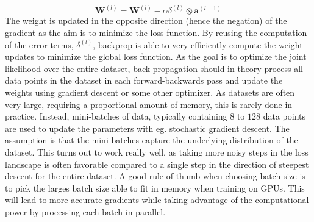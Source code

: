 \documentclass[a4paper,11pt]{article}
\begin{document}
\begin{equation} \label{eq:weight-update}
  \mathbf{W}^{(l)} = \mathbf{W}^{(l)} -\alpha \delta^{(l)} \otimes \mathbf{a}^{(l-1)}
\end{equation}
The weight is updated in the opposite direction (hence the negation) of the gradient as the aim is to minimize the loss function. By reusing the computation of the error terms, $\delta^{(l)}$, backprop is able to very efficiently compute the weight updates to minimize the global loss function. As the goal is to optimize the joint likelihood over the entire dataset, back-propagation should in theory process all data points in the dataset in each forward-backwards pass and update the weights using gradient descent or some other optimizer. As datasets are often very large, requiring a proportional amount of memory, this is rarely done in practice. Instead, mini-batches of data, typically containing $8$ to $128$ data points are used to update the parameters with eg. stochastic gradient descent. The assumption is that the mini-batches capture the underlying distribution of the dataset. This turns out to work really well, as taking more noisy steps in the loss landscape is often favorable compared to a single step in the direction of steepest descent for the entire dataset. A good rule of thumb when choosing batch size is to pick the larges batch size able to fit in memory when training on GPUs. This will lead to more accurate gradients while taking advantage of the computational power by processing each batch in parallel. 
\end{document}
